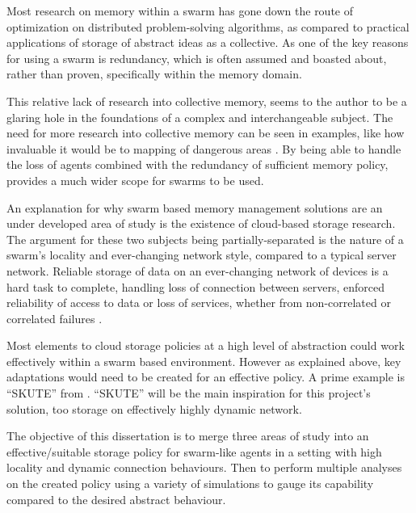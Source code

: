 \documentclass{UoYCSproject}
\begin{document}
Most research on memory within a swarm has gone down the route of optimization on distributed problem-solving algorithms, as compared to practical applications of storage of abstract ideas as a collective.
As one of the key reasons for using a swarm is redundancy, which is often assumed and boasted about, rather than proven, specifically within the memory domain.

This relative lack of research into collective memory, seems to the author to be a glaring hole in the foundations of a complex and interchangeable subject.
The need for more research into collective memory can be seen in examples, like how invaluable it would be to mapping of dangerous areas \cite{Cognitive maps mine detection}.
By being able to handle the loss of agents combined with the redundancy of sufficient memory policy, provides a much wider scope for swarms to be used.

An explanation for why swarm based memory management solutions are an under developed area of study is the existence of cloud-based storage research.
The argument for these two subjects being partially-separated is the nature of a swarm's locality and ever-changing network style, compared to a typical server network.
Reliable storage of data on an ever-changing network of devices is a hard task to complete, handling loss of connection between servers, enforced reliability of access to data or loss of services, whether from non-correlated or correlated failures \cite{Avalability storage}.

Most elements to cloud storage policies at a high level of abstraction could work effectively within a swarm based environment.
However as explained above, key adaptations would need to be created for an effective policy.
A prime example is “SKUTE” from \cite{Distributed Storage}.
“SKUTE” will be the main inspiration for this project's solution, too storage on effectively highly dynamic network.

The objective of this dissertation is to merge three areas of study into an effective/suitable storage policy for swarm-like agents in a setting with high locality and dynamic connection behaviours.
Then to perform multiple analyses on the created policy using a variety of simulations to gauge its capability compared to the desired abstract behaviour.
\end{document}
